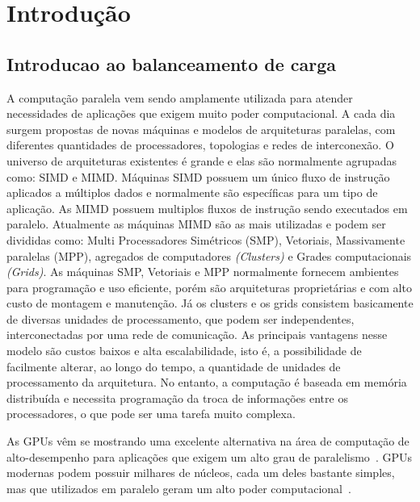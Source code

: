 \cleardoublepage
\pagestyle{fancy}

\chapter{Introdução}\label{intro}

\section{Introducao ao balanceamento de carga}\label{cap1:intro}

A computação paralela vem sendo amplamente utilizada para atender necessidades de aplicações que exigem muito poder computacional. A cada dia surgem propostas de novas máquinas e modelos de arquiteturas paralelas, com diferentes quantidades de processadores, topologias e redes de interconexão. O universo de arquiteturas existentes é grande e elas são normalmente agrupadas como: SIMD e MIMD. Máquinas SIMD possuem um único fluxo de instrução aplicados a múltiplos dados e normalmente são específicas para um tipo de aplicação. As MIMD possuem multiplos fluxos de instrução sendo executados em paralelo. Atualmente as máquinas MIMD são as mais utilizadas e podem ser divididas como: Multi Processadores Simétricos (SMP), Vetoriais, Massivamente paralelas (MPP), agregados de computadores \emph{(Clusters)} e Grades computacionais \emph{(Grids)}. As máquinas SMP, Vetoriais e MPP normalmente fornecem ambientes para programação e uso eficiente, porém são arquiteturas proprietárias e com alto custo de montagem e manutenção. Já os clusters e os grids consistem basicamente de diversas unidades de processamento, que podem ser independentes, interconectadas por uma rede de comunicação. As principais vantagens nesse modelo são custos baixos e alta escalabilidade, isto  é, a possibilidade de facilmente alterar, ao longo do tempo, a quantidade de unidades de processamento da arquitetura. No entanto, a computação é baseada em memória distribuída e necessita programação da troca de informações entre os processadores, o que pode ser uma tarefa muito complexa.

As GPUs vêm se mostrando uma excelente alternativa na área de computação de
alto-desempenho para aplicações que exigem um alto grau de
paralelismo~\cite{gpu}. GPUs modernas podem possuir milhares de núcleos, cada um
deles bastante simples, mas que utilizados em paralelo geram um alto poder
computacional~\cite{cuda}.

